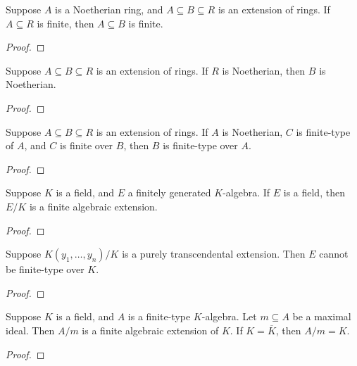 \begin{proposition}
    Suppose \(A\) is a Noetherian ring,
    and \(A \subseteq B \subseteq R\) is an extension of rings.
    If \(A \subseteq R\) is finite, then \(A \subseteq B\) is finite.
\end{proposition}
\begin{proof}
    
\end{proof}
\begin{proposition}
    Suppose \(A \subseteq B \subseteq R\) is an extension of rings.
    If \(R\) is Noetherian, then \(B\) is Noetherian.
\end{proposition}
\begin{proof}
    
\end{proof}
\begin{theorem}
    Suppose \(A \subseteq B \subseteq R\) is an extension of rings.
    If \(A\) is Noetherian, \(C\) is finite-type of \(A\),
    and \(C\) is finite over \(B\),
    then \(B\) is finite-type over \(A\).
\end{theorem}
\begin{proof}
    
\end{proof}
\begin{proposition}
    Suppose \(K\) is a field, and \(E\) a finitely generated \(K\)-algebra.
    If \(E\) is a field, then \(E/K\) is a finite algebraic extension.
\end{proposition}
\begin{proof}
    
\end{proof}
\begin{proposition}
    Suppose \(K(y_1,\hdots,y_n)/K\) is a purely transcendental extension.
    Then \(E\) cannot be finite-type over \(K\).
\end{proposition}
\begin{proof}
    
\end{proof}
\begin{corollary}
    Suppose \(K\) is a field, and \(A\) is a finite-type \(K\)-algebra.
    Let \(m \subseteq A\) be a maximal ideal.
    Then \(A/m\) is a finite algebraic extension of \(K\).
    If \(K = \overline{K}\), then \(A/m = K\).
\end{corollary}
\begin{proof}
    
\end{proof}

